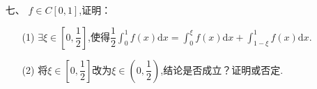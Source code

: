 \documentclass{ctexbook}
\begin{document}
\begin{enumerate}[leftmargin=*,labelwidth=!,labelsep=0pt]
    \item[七、]\(f\in C[0,1]\),证明：
    \begin{enumerate}[leftmargin=*,labelwidth=!,labelsep=0pt]
        \item[(1)] \(\exists\xi\in[0,\dfrac{1}{2}]\),使得\(\dfrac{1}{2}\int_{0}^{1}f(x) \mathrm{d}x=\int_{0}^{\xi}f(x) \mathrm{d}x+\int_{1-\xi}^{1}f(x) \mathrm{d}x\).
        \item[(2)] 将\(\xi\in[0,\dfrac{1}{2}]\)改为\(\xi\in(0,\dfrac{1}{2})\),结论是否成立？证明或否定.
    \end{enumerate}

\end{enumerate}
\end{document}
